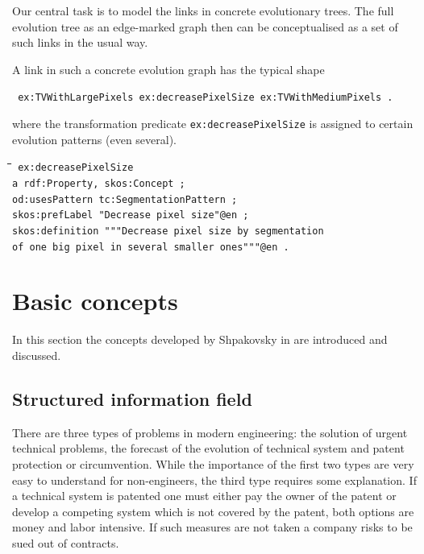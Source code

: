 \documentclass[11pt,a4paper]{article}
\newenvironment{code}{\tt \begin{tabbing}
\hskip12pt\=\hskip12pt\=\hskip12pt\=\hskip12pt\=\hskip5cm\=\hskip5cm\=\kill}
{\end{tabbing}}
\begin{document}
Our central task is to model the links in concrete evolutionary trees. The
full evolution tree as an edge-marked graph then can be conceptualised as a
set of such links in the usual way.

A link in such a concrete evolution graph has the typical shape
\begin{center}\tt
  ex:TVWithLargePixels ex:decreasePixelSize ex:TVWithMediumPixels .
\end{center}
where the transformation predicate \texttt{ex:decreasePixelSize} is assigned
to certain evolution patterns (even several).
\begin{code}\tt
ex:decreasePixelSize \\
\> a rdf:Property, skos:Concept ; \\
\> od:usesPattern tc:SegmentationPattern ; \\
\> skos:prefLabel "Decrease pixel size"@en ; \\
\> skos:definition """Decrease pixel size by segmentation \\
\>\> of one big pixel in several smaller ones"""@en .
\end{code}

\section{Basic concepts}

In this section the concepts developed by Shpakovsky in \cite{Shpakovsky2016}
are introduced and discussed.

\subsection{Structured information field}

There are three types of problems in modern engineering: the solution of
urgent technical problems, the forecast of the evolution of technical system
and patent protection or circumvention. While the importance of the first two
types are very easy to understand for non-engineers, the third type requires
some explanation. If a technical system is patented one must either pay the
owner of the patent or develop a competing system which is not covered by the
patent, both options are money and labor intensive. If such measures are not
taken a company risks to be sued out of contracts.
\end{document}
